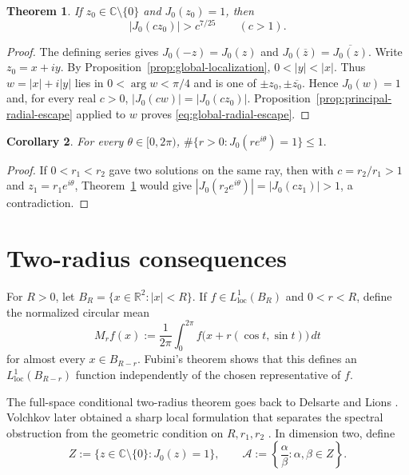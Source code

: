\documentclass[11pt]{amsart}
\numberwithin{equation}{section}
\newtheorem{theorem}{Theorem}[section]
\newtheorem{corollary}[theorem]{Corollary}
\theoremstyle{definition}
\theoremstyle{remark}
\newcommand{\C}{\mathbb C}
\newcommand{\R}{\mathbb R}
\begin{document}
\begin{theorem}\label{thm:global-radial-escape}
If $z_0\in\C\setminus\{0\}$ and $J_0(z_0)=1$, then
\begin{equation}\label{eq:global-radial-escape}
   |J_0(cz_0)|>c^{7/25}\qquad(c>1).
\end{equation}
\end{theorem}

\begin{proof}
The defining series gives $J_0(-z)=J_0(z)$ and
$J_0(\overline z)=\overline{J_0(z)}$.  Write $z_0=x+iy$.  By
Proposition~\ref{prop:global-localization}, $0<|y|<|x|$.  Thus
$w=|x|+i|y|$ lies in $0<\arg w<\pi/4$ and is one of
$\pm z_0,\pm\overline{z_0}$.  Hence $J_0(w)=1$ and, for every real $c>0$,
$|J_0(cw)|=|J_0(cz_0)|$.  Proposition~\ref{prop:principal-radial-escape}
applied to $w$ proves \eqref{eq:global-radial-escape}.
\end{proof}

\begin{corollary}\label{cor:ray-uniqueness}
For every $\theta\in[0,2\pi)$,
$
   \#\{r>0:J_0(re^{i\theta})=1\}\le1.
$
\end{corollary}

\begin{proof}
If $0<r_1<r_2$ gave two solutions on the same ray, then with
$c=r_2/r_1>1$ and $z_1=r_1e^{i\theta}$,
Theorem~\ref{thm:global-radial-escape} would give
$|J_0(r_2e^{i\theta})|=|J_0(cz_1)|>1$, a contradiction.
\end{proof}

\section{Two-radius consequences}\label{sec:two-radius}

For $R>0$, let $B_R=\{x\in\R^2:|x|<R\}$.  If
$f\in L^1_{\mathrm{loc}}(B_R)$ and $0<r<R$, define the normalized circular mean
\[
   M_rf(x):=\frac1{2\pi}\int_0^{2\pi}
   f\bigl(x+r(\cos t,\sin t)\bigr)\,dt
\]
for almost every $x\in B_{R-r}$.  Fubini's theorem shows that this defines
an $L^1_{\mathrm{loc}}(B_{R-r})$ function independently of the chosen
representative of $f$.

The full-space conditional two-radius theorem goes back to Delsarte and
Lions \cite{DelsarteLions1959,Delsarte1961}.  Volchkov later obtained a
sharp local formulation that separates the spectral obstruction from the
geometric condition on $R,r_1,r_2$ \cite[Theorem~1]{Volchkov1996}.  In
dimension two, define
\[
   Z:=\{z\in\C\setminus\{0\}:J_0(z)=1\},
   \qquad
   \mathcal A:=\left\{\frac{\alpha}{\beta}:\alpha,\beta\in Z\right\}.
\]
\end{document}
